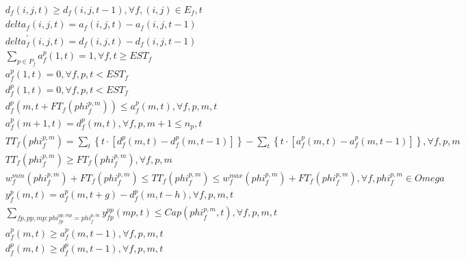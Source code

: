\begin{align}
  & d_{f} \left(i , j , t\right) \geq d_{f} \left(i , j , t - 1\right) , \forall f , \left(i , j\right) \in E_{f} , t \tag{eq\_0035} \\
  & \mathit{delta}_{f} \left(i , j , t\right) = a_{f} \left(i , j , t\right) - a_{f} \left(i , j , t - 1\right) \tag{eq\_0041} \\
  & \mathit{delta}_{f}^{'} \left(i , j , t\right) = d_{f} \left(i , j , t\right) - d_{f} \left(i , j , t - 1\right) \tag{eq\_0042} \\
  & \sum_{p \in P_{f}} a_{f}^{p} \left(1 , t\right) = 1 , \forall f , t \geq \mathit{EST}_{f} \tag{eq\_0048} \\
  & a_{f}^{p} \left(1 , t\right) = 0 , \forall f , p , t < \mathit{EST}_{f} \tag{eq\_0049} \\
  & d_{f}^{p} \left(1 , t\right) = 0 , \forall f , p , t < \mathit{EST}_{f} \tag{eq\_0050} \\
  & d_{f}^{p} \left(m , t + \mathit{FT}_{f} \left(\mathit{phi}_{f}^{p , m}\right)\right) \leq a_{f}^{p} \left(m , t\right) , \forall f , p , m , t \tag{eq\_0051} \\
  & a_{f}^{p} \left(m + 1 , t\right) = d_{f}^{p} \left(m , t\right) , \forall f , p , m + 1 \leq n_{p} , t \tag{eq\_0052} \\
  & \mathit{TT}_{f} \left(\mathit{phi}_{f}^{p , m}\right) = \sum_{t} \left\{t \cdot \left[d_{f}^{p} \left(m , t\right) - d_{f}^{p} \left(m , t - 1\right)\right]\right\} - \sum_{t} \left\{t \cdot \left[a_{f}^{p} \left(m , t\right) - a_{f}^{p} \left(m , t - 1\right)\right]\right\} , \forall f , p , m \tag{eq\_0053} \\
  & \mathit{TT}_{f} \left(\mathit{phi}_{f}^{p , m}\right) \geq \mathit{FT}_{f} \left(\mathit{phi}_{f}^{p , m}\right) , \forall f , p , m \tag{eq\_0054} \\
  & w_{f}^{min} \left(\mathit{phi}_{f}^{p , m}\right) + \mathit{FT}_{f} \left(\mathit{phi}_{f}^{p , m}\right) \leq \mathit{TT}_{f} \left(\mathit{phi}_{f}^{p , m}\right) \leq w_{f}^{max} \left(\mathit{phi}_{f}^{p , m}\right) + \mathit{FT}_{f} \left(\mathit{phi}_{f}^{p , m}\right) , \forall f , \mathit{phi}_{f}^{p , m} \in \mathit{Omega} \tag{eq\_0055} \\
  & y_{f}^{p} \left(m , t\right) = a_{f}^{p} \left(m , t + g\right) - d_{f}^{p} \left(m , t - h\right) , \forall f , p , m , t \tag{eq\_0056} \\
  & \underset{fp , pp , mp : \mathit{phi}_{fp}^{pp , mp} = \mathit{phi}_{f}^{p , m}}{\sum} y_{fp}^{pp} \left(mp , t\right) \leq \mathit{Cap} \left(\mathit{phi}_{f}^{p , m} , t\right) , \forall f , p , m , t \tag{eq\_0057} \\
  & a_{f}^{p} \left(m , t\right) \geq a_{f}^{p} \left(m , t - 1\right) , \forall f , p , m , t \tag{eq\_0058} \\
  & d_{f}^{p} \left(m , t\right) \geq d_{f}^{p} \left(m , t - 1\right) , \forall f , p , m , t \tag{eq\_0059} \\
\end{align}

